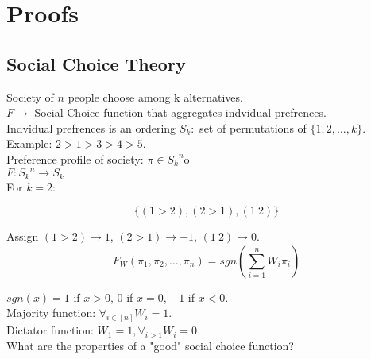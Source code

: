 \chapter{Proofs}

\section{Social Choice Theory}

Society of $n$ people choose among k alternatives.\\

$F \rightarrow$ Social Choice function that aggregates indvidual
prefrences.\\

Indvidual prefrences is an ordering $S_k:$ set of permutations of
$\{1, 2, \dots, k\}$. Example: $2 > 1 > 3 > 4 > 5$.\\

Preference profile of society: $\pi \in {S_k}^{n}$o\\

$F: {S_k}^{n} \rightarrow S_k$\\

For $k = 2:$

$$
\{(1 > 2), (2 > 1), (1 ~ 2)\}
$$

Assign $(1 > 2) \rightarrow 1$, $(2 > 1) \rightarrow -1$,
$(1 ~ 2) \rightarrow 0$.\\

$$
F_W(\pi_1, \pi_2, \dots, \pi_n) =
sgn(\sum\limits_{i = 1}^{n} W_i\pi_i)
$$

$sgn(x) = 1$ if $x > 0$, $0$ if $x = 0$, $-1$ if $x < 0$.\\

Majority function: $\forall_{i \in [n]} W_i = 1$.\\

Dictator function: $W_1 = 1, \forall_{i > 1} W_i = 0$\\

What are the properties of a "good" social choice function?


